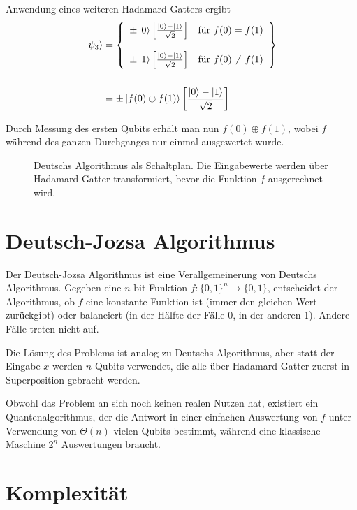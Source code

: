 \documentclass{acm_proc_article-sp}
\begin{document}
Anwendung eines weiteren Hadamard-Gatters ergibt
\begin{equation}
    \begin{split}
        \left|\psi_3\right\rangle &= \left\{\begin{array}{lr}
            \pm \left|0\right\rangle \left[\frac{\left|0\right\rangle - \left|1\right\rangle}{\sqrt 2}\right] & \text{für } f(0) = f(1) \\[1.5em]
            \pm \left|1\right\rangle \left[\frac{\left|0\right\rangle - \left|1\right\rangle}{\sqrt 2}\right] & \text{für } f(0) \neq f(1) 
        \end{array}\right\} \\[1.5em] &= \pm \left|f(0) \oplus f(1)\right\rangle \left[\frac{\left|0\right\rangle - \left|1\right\rangle}{\sqrt 2}\right]
    \end{split}
\end{equation}

Durch Messung des ersten Qubits erhält man nun \linebreak $f(0) \oplus f(1)$, wobei $f$ während des
ganzen Durchganges nur einmal ausgewertet wurde.

\begin{figure}
    \pictureDeutschAlgo
    \caption{Deutschs Algorithmus als Schaltplan. Die Eingabewerte werden über Hadamard-Gatter transformiert, bevor die
    Funktion $f$ ausgerechnet wird.}
    \label{fig:deutschs}
\end{figure}

\section{Deutsch-Jozsa Algorithmus}

Der Deutsch-Jozsa Algorithmus ist eine Verallgemeinerung von Deutschs Algorithmus.
Gegeben eine $n$-bit Funktion \linebreak $f : \{0,1\}^n \rightarrow \{0,1\} $, entscheidet 
der Algorithmus, ob $f$ eine konstante Funktion
ist (immer den gleichen Wert zurückgibt) oder balanciert (in der Hälfte der Fälle 0, in der anderen 1). 
Andere Fälle treten nicht auf.

Die Lösung des Problems ist analog zu Deutschs Algorithmus, aber statt der Eingabe $x$ werden $n$ Qubits verwendet, 
die alle über Hadamard-Gatter zuerst in Superposition gebracht werden.

Obwohl das Problem an sich noch keinen realen Nutzen hat, existiert ein Quantenalgorithmus, der die Antwort in einer einfachen
Auswertung von $f$ unter Verwendung von $\Theta(n)$ vielen Qubits bestimmt, 
während eine klassische Maschine $2^n$ Auswertungen braucht.

\section{Komplexität}
\end{document}
